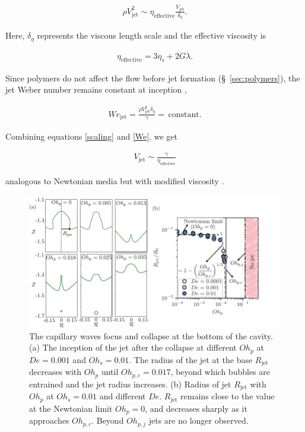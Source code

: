 \documentclass{jfm}
\newcommand{\oo}{\color{magenta} \normalfont}
\newcommand{\bb}{\color{black} \normalfont}
\begin{document}
\begin{align}
	\rho V_{\text{jet}}^2 \sim \eta_{\text{effective}}\frac{V_{\text{jet}}}{\delta_\eta}.
	\label{scaling}
\end{align}

\noindent Here, $\delta_\eta$ represents the viscous length scale and the effective viscosity is

\begin{align}
	\label{eqn:etaEff}
  \eta_{\text{effective}} = 3\eta_s + 2G\lambda .
\end{align}

\noindent \oo Since polymers do not affect the flow before jet formation (\S~\ref{sec:polymers}), the jet Weber number remains constant at inception \citep{blanco2021jets},\bb

\begin{align}
	We_{\text{jet}} = \frac{\rho V_{\text{jet}}^2 \delta_\eta}{\gamma} =\,\text{constant}.
	\label{We}
\end{align}

\noindent Combining equations \eqref{scaling} and \eqref{We}, we get

\begin{align}
	V_{\text{jet}}  \sim \frac{\gamma}{\eta_{\text{effective}}}
	\label{velocityscale}
\end{align}

\noindent \oo analogous to Newtonian media but with modified viscosity \citep{gordillo2019capillary, blanco2020sea}.\bb


\begin{figure}
	\centering
	\includegraphics[width=\textwidth]{Figures/Rjet_Ohp/Rjet_Ohp_05-eps-converted-to.pdf}
	\caption{
		The capillary waves focus and collapse at the bottom of the cavity. (a) The inception of the jet after the collapse at different $Oh_p$ at $De = 0.001$ and $Oh_s = 0.01$. The radius of the jet at the base $R_{\text{jet}}$ decreases with $Oh_p$ until $Oh_{p,c} = 0.017$, beyond which bubbles are entrained and the jet radius increases.
		(b) Radius of jet $R_{\text{jet}}$ with $Oh_p$ at  $Oh_s = 0.01$ and different $De$. $R_{\text{jet}}$ remains close to the value at the Newtonian limit $Oh_p = 0$, and decreases sharply as it approaches $Oh_{p,c}$. Beyond $Oh_{p,j}$ jets are no longer observed.
	}
	\label{Rjet_Ohp}
\end{figure}
\end{document}
